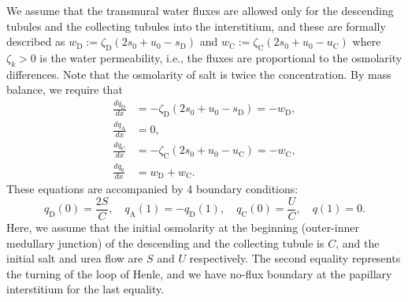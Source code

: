 \documentclass{article}
\numberwithin{equation}{section} %
\begin{document}
We assume that the transmural water fluxes are allowed only for the descending tubules and the collecting tubules into the interstitium, and these are formally described as $w_\mathrm{D}:=\zeta_\mathrm{D}(2s_0+u_0-s_\mathrm{D})$ and $w_\mathrm{C}:=\zeta_\mathrm{C}(2s_0+u_0 - u_\mathrm{C})$ where $\zeta_k>0$ is the water permeability, i.e., the fluxes are proportional to the osmolarity differences.
Note that the osmolarity of salt is twice the concentration.
By mass balance, we require that
\begin{align}
    \frac{dq_\mathrm{D}}{dx} &= -\zeta_\mathrm{D}\left( 2s_0+u_0 - s_\mathrm{D} \right) = -w_\mathrm{D},\label{eq:q_D_eq}\\
    \frac{dq_\mathrm{A}}{dx} &= 0,\label{eq:q_A_eq}\\
    \frac{dq_\mathrm{C}}{dx} &= -\zeta_\mathrm{C}\left( 2s_0+u_0 - u_\mathrm{C} \right) = -w_\mathrm{C},\label{eq:q_C_eq}\\
    \frac{dq_0}{dx} &= w_\mathrm{D}+w_\mathrm{C}.\label{eq:q_0_eq}
\end{align}
These equations are accompanied by 4 boundary conditions:
\begin{equation}\label{eq:q_bdry}
    q_\mathrm{D}(0) = \frac{2S}{C},\quad q_\mathrm{A}(1) = -q_\mathrm{D}(1),\quad q_\mathrm{C}(0) = \frac{U}{C},\quad q(1) = 0.
\end{equation}
Here, we assume that the initial osmolarity at the beginning (outer-inner medullary junction) of the descending and the collecting tubule is $C$, and the initial salt and urea flow are $S$ and $U$ respectively.
The second equality represents the turning of the loop of Henle, and we have no-flux boundary at the papillary interstitium for the last equality.
\end{document}
